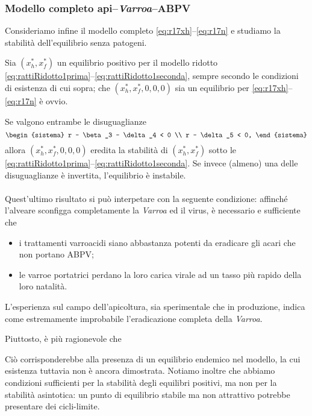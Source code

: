 \subsubsection{Modello completo api--\emph{Varroa}--ABPV}
Consideriamo infine il modello completo \eqref{eq:r17xh}--\eqref{eq:r17n} e studiamo la stabilità dell'equilibrio senza patogeni.

Sia $(x_h^*, x_f^*)$ un equilibrio positivo per il modello ridotto \eqref{eq:rattiRidotto1prima}--\eqref{eq:rattiRidotto1seconda}, sempre secondo le condizioni di esistenza di cui sopra; che $(x_h^*, x_f^*, 0,0,0)$ sia un equilibrio per \eqref{eq:r17xh}--\eqref{eq:r17n} è ovvio.

Se valgono entrambe le disuguaglianze
$$
\begin{sistema}
    r - \beta_3 - \delta_4 < 0 \\
    r - \delta_5 < 0,
\end{sistema}
$$
allora $(x_h^*, x_f^*, 0,0,0)$ eredita la stabilità di $(x_h^*, x_f^*)$ sotto le \eqref{eq:rattiRidotto1prima}--\eqref{eq:rattiRidotto1seconda}.
Se invece (almeno) una delle disuguaglianze è invertita, l'equilibrio è instabile.

\paragraph{}
Quest'ultimo risultato si può interpetare con la seguente condizione: affinché l'alveare sconfigga completamente la \emph{Varroa} ed il virus, è necessario e sufficiente che
\begin{itemize}
    \item i trattamenti varroacidi siano abbastanza potenti da eradicare gli acari che non portano ABPV;
    \item le varroe portatrici perdano la loro carica virale ad un tasso più rapido della loro natalità.
\end{itemize}

L'esperienza sul campo dell'apicoltura, sia sperimentale che in produzione, indica come estremamente improbabile l'eradicazione completa della \emph{Varroa}.~\cite{privFPan}

Piuttosto, è più ragionevole che 

Ciò corrisponderebbe alla presenza di un equilibrio endemico nel modello, la cui esistenza tuttavia non è ancora dimostrata.
Notiamo inoltre che abbiamo condizioni sufficienti per la stabilità degli equilibri positivi, ma non per la stabilità asintotica: un punto di equilibrio stabile ma non attrattivo potrebbe presentare dei cicli-limite.


